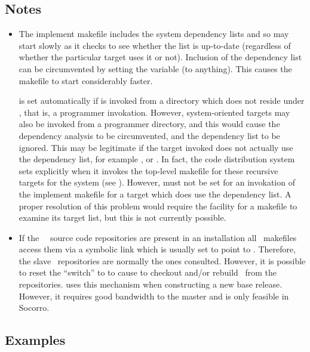 \subsection*{Notes}

\begin{itemize}
\item
   The implement makefile includes the system dependency lists and so may
   start slowly as it checks to see whether the list is up-to-date (regardless
   of whether the particular target uses it or not).  Inclusion of the
   dependency list can be circumvented by setting the  variable
   (to anything).  This causes the makefile to start considerably faster.

    is set automatically if  is invoked from a
   directory which does not reside under , that is, a
   programmer invokation.  However, system-oriented targets may also be
   invoked from a programmer directory, and this would cause the dependency
   analysis to be circumvented, and the dependency list to be ignored.  This
   may be legitimate if the target invoked does not actually use the
   dependency list, for example ,  or
   .  In fact, the code distribution system sets 
   explicitly when it invokes the top-level makefile for these recursive
   targets for the system (see ).  However,  must
   not be set for an invokation of the implement makefile for a target which
   does use the dependency list.  A proper resolution of this problem would
   require the facility for a makefile to examine its target list, but this is
   not currently possible.

\item
   If the \aipspp\ \rcs\ source code repositories are present in an
   installation all \aipspp\ makefiles access them via a symbolic link
    which is usually set to point to .
   Therefore, the slave \rcs\ repositories are normally the ones consulted.
   However, it is possible to reset the  ``switch'' to 
   to cause  to checkout and/or rebuild \aipspp\ from the
    repositories.   uses this mechanism when
   constructing a new base release.  However, it requires good bandwidth to
   the master and is only feasible in Socorro.
\end{itemize}

\subsection*{Examples}

